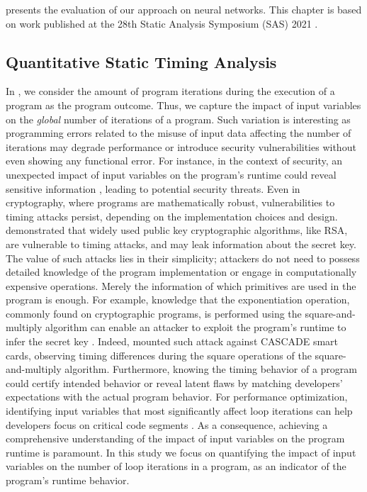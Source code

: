  presents the evaluation of our approach on neural networks.
This chapter is based on work published at the 28th Static Analysis Symposium (SAS) 2021 .

\subsection{Quantitative Static Timing Analysis}

In , we consider the amount of program iterations during the execution of a program as the program outcome.
Thus, we capture the impact of input variables on the \emph{global} number of iterations of a program.
Such variation is interesting as programming errors related to the misuse of input data affecting the number of iterations may degrade performance or introduce security vulnerabilities without even showing any functional error.
For instance, in the context of security, an unexpected impact of input variables on the program's runtime could reveal sensitive information , leading to potential security threats.
Even in cryptography, where programs are mathematically robust, vulnerabilities to timing attacks persist, depending on the implementation choices and design.
 demonstrated that widely used public key cryptographic algorithms, like RSA, are vulnerable to timing attacks, and may leak information about the secret key.
The value of such attacks lies in their simplicity;
attackers do not need to possess detailed knowledge of the program implementation or engage in computationally expensive operations.
Merely the information of which primitives are used in the program is enough.
For example, knowledge that the exponentiation operation, commonly found on cryptographic programs, is performed using the square-and-multiply algorithm can enable an attacker to exploit the program's runtime to infer the secret key .
Indeed,  mounted such attack against CASCADE smart cards, observing timing differences during the square operations of the square-and-multiply algorithm.
Furthermore, knowing the timing behavior of a program could certify intended behavior or reveal latent flaws by matching developers' expectations with the actual program behavior.
For performance optimization, identifying input variables that most significantly affect loop iterations can help developers focus on critical code segments .
As a consequence, achieving a comprehensive understanding of the impact of input variables on the program runtime is paramount.
In this study we focus on quantifying the impact of input variables on the number of loop iterations in a program, as an indicator of the program's runtime behavior.


